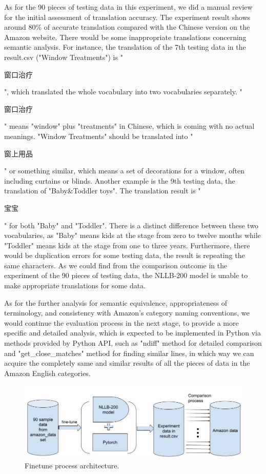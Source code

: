 \documentclass[sigconf]{acmart}
\begin{document}
As for the 90 pieces of testing data in this experiment, we did a manual review for the initial assessment of translation accuracy. The experiment result shows around 80\% of accurate translation compared with the Chinese version on the Amazon website. There would be some inappropriate translations concerning semantic analysis.\cite{palmer_wu_1995} For instance, the translation of the 7th testing data in the result.csv ("Window Treatments") is "\begin{CJK*}{UTF8}{gbsn}窗口治疗\end{CJK*}", which translated the whole vocabulary into two vocabularies separately. "\begin{CJK*}{UTF8}{gbsn}窗口治疗\end{CJK*}" means "window" plus "treatments" in Chinese, which is coming with no actual meanings. "Window Treatments" should be translated into "\begin{CJK*}{UTF8}{gbsn}窗上用品\end{CJK*}" or something similar, which means a set of decorations for a window, often including curtains or blinds.\cite{window_treatment_definition_meaning_yourdictionary} Another example is the 9th testing data, the translation of "Baby\&Toddler toys". The translation result is "\begin{CJK*}{UTF8}{gbsn}宝宝\end{CJK*}" for both "Baby" and "Toddler". There is a distinct difference between these two vocabularies, as "Baby" means kids at the stage from zero to twelve months while "Toddler" means kids at the stage from one to three years.\cite{american_academy_of_pediatrics_2019} Furthermore, there would be duplication errors for some testing data, the result is repeating the same characters.\cite{koponen_2010} As we could find from the comparison outcome in the experiment of the 90 pieces of testing data, the NLLB-200 model is unable to make appropriate translations for some data. 

As for the further analysis for semantic equivalence, appropriateness of terminology, and consistency with Amazon's category naming conventions, we would continue the evaluation process in the next stage, to provide a more specific and detailed analysis, which is expected to be implemented in Python via methods provided by Python API, such as "ndiff" method for detailed comparison and "get\_close\_matches" method for finding similar lines, \cite{difflib_helpers_for_computing-deltas_python_documentation}in which way we can acquire the completely same and similar results of all the pieces of data in the Amazon English categories.

\begin{figure}[t]
    \centering
    \includegraphics[width=1.1\linewidth]{Reports//Proposed Solution (Method)//Report/illustrate_figure.jpeg}
    \caption{Finetune process architecture.}
    
\end{figure}


 
\end{document}
